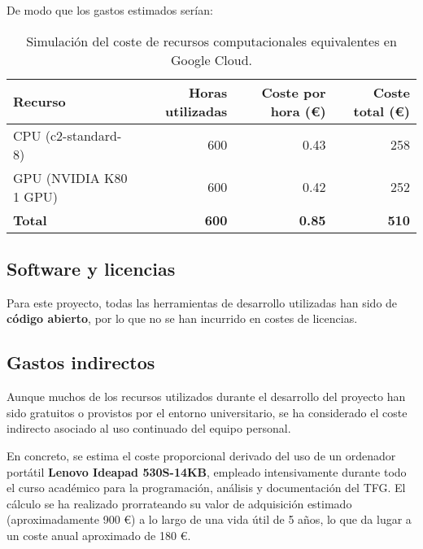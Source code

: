 De modo que los gastos estimados serían:
\begin{table}[htp]
    \centering
    \begin{adjustbox}{width=\linewidth}
        \begin{tabular}{|l|r|r|r|}
            \hline
            \textbf{Recurso}       & \textbf{Horas utilizadas} & \textbf{Coste por hora (€)} &
            \textbf{Coste total (€)}                                                                        \\ \hline
            CPU (c2-standard-8)    & 600                       & 0.43                        & 258          \\
            GPU (NVIDIA K80 1 GPU) & 600                       & 0.42                        & 252          \\ \hline
            \textbf{Total}         & \textbf{600}              & \textbf{0.85}               & \textbf{510} \\ \hline
        \end{tabular}
    \end{adjustbox}
    \caption{Simulación del coste de recursos computacionales equivalentes en Google Cloud.}
    \label{tab:recursos-computacionales}
\end{table}


\subsection{Software y licencias}\label{subsec:software-y-licencias}
Para este proyecto, todas las herramientas de desarrollo utilizadas han sido de \textbf{código abierto},
por lo que no se han incurrido en costes de licencias.

\subsection{Gastos indirectos}\label{subsec:gastos-indirectos}
Aunque muchos de los recursos utilizados durante el desarrollo del proyecto han sido gratuitos o provistos por el entorno universitario,
se ha considerado el coste indirecto asociado al uso continuado del equipo personal.

En concreto, se estima el coste proporcional derivado del uso de un ordenador portátil \textbf{Lenovo Ideapad 530S-14KB},
empleado intensivamente durante todo el curso académico para la programación, análisis y documentación del TFG.
El cálculo se ha realizado prorrateando su valor de adquisición estimado (aproximadamente 900 €) a lo largo de una vida útil de 5 años,
lo que da lugar a un coste anual aproximado de 180 €.

